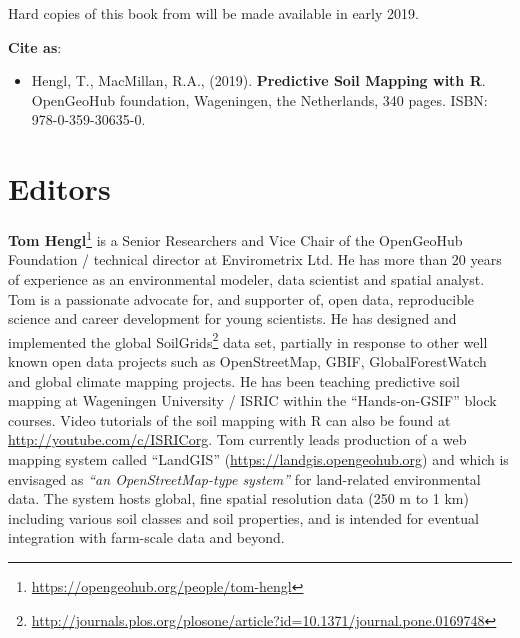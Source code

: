 \documentclass[graybox,natbib,nospthms,UStrade]{svmono}
\providecommand{\tightlist}{%
  \setlength{\itemsep}{0pt}\setlength{\parskip}{0pt}}
\providecommand{\tightlist}{\setlength{\itemsep}{0pt}\setlength{\parskip}{0pt}}
\renewcommand{\href}[2]{#2 (\url{#1})}
\renewcommand{\href}[2]{#2\footnote{\url{#1}}}
\begin{document}
Hard copies of this book from will be made available in early 2019.

\textbf{Cite as}:

\begin{itemize}
\tightlist
\item
  Hengl, T., MacMillan, R.A., (2019). \textbf{Predictive Soil Mapping with R}. OpenGeoHub foundation, Wageningen, the Netherlands, 340 pages. ISBN: 978-0-359-30635-0.
\end{itemize}

\hypertarget{editors}{%
\section*{Editors}\label{editors}}

\href{https://opengeohub.org/people/tom-hengl}{\textbf{Tom Hengl}} is a Senior Researchers and Vice Chair of the OpenGeoHub Foundation / technical director at Envirometrix Ltd.
He has more than 20 years of experience as an environmental modeler, data scientist and spatial analyst.
Tom is a passionate advocate for, and supporter of, open data, reproducible science and career development
for young scientists. He has designed and implemented the global \href{http://journals.plos.org/plosone/article?id=10.1371/journal.pone.0169748}{SoilGrids} data set,
partially in response to other well known open data projects such as OpenStreetMap, GBIF, GlobalForestWatch
and global climate mapping projects. He has been teaching predictive soil mapping at Wageningen University /
ISRIC within the ``Hands-on-GSIF'' block courses. Video tutorials of the soil mapping with R can also be
found at \url{http://youtube.com/c/ISRICorg}. Tom currently leads production of a web mapping system called ``LandGIS'' (\url{https://landgis.opengeohub.org}) and which is envisaged as \emph{``an OpenStreetMap-type system''} for land-related environmental data. The system hosts global, fine spatial resolution data (250 m to 1 km) including various soil classes and soil properties, and is intended for eventual integration with farm-scale data and beyond.
\end{document}
